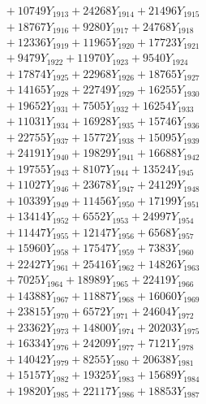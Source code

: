 \documentclass[a4paper,10pt]{article}
\begin{document}
{\begin{align}
&\;  + 10749 Y_{1913} + 24268 Y_{1914} + 21496 Y_{1915} \\[0.3ex]
&\;  + 18767 Y_{1916} + 9280 Y_{1917} + 24768 Y_{1918} \\[0.5ex]\allowbreak
&\;  + 12336 Y_{1919} + 11965 Y_{1920} + 17723 Y_{1921} \\[0.3ex]
&\;  + 9479 Y_{1922} + 11970 Y_{1923} + 9540 Y_{1924} \\[0.3ex]
&\;  + 17874 Y_{1925} + 22968 Y_{1926} + 18765 Y_{1927} \\[0.3ex]
&\;  + 14165 Y_{1928} + 22749 Y_{1929} + 16255 Y_{1930} \\[0.3ex]
&\;  + 19652 Y_{1931} + 7505 Y_{1932} + 16254 Y_{1933} \\[0.3ex]
&\;  + 11031 Y_{1934} + 16928 Y_{1935} + 15746 Y_{1936} \\[0.3ex]
&\;  + 22755 Y_{1937} + 15772 Y_{1938} + 15095 Y_{1939} \\[0.3ex]
&\;  + 24191 Y_{1940} + 19829 Y_{1941} + 16688 Y_{1942} \\[0.3ex]
&\;  + 19755 Y_{1943} + 8107 Y_{1944} + 13524 Y_{1945} \\[0.3ex]
&\;  + 11027 Y_{1946} + 23678 Y_{1947} + 24129 Y_{1948} \\[0.5ex]\allowbreak
&\;  + 10339 Y_{1949} + 11456 Y_{1950} + 17199 Y_{1951} \\[0.3ex]
&\;  + 13414 Y_{1952} + 6552 Y_{1953} + 24997 Y_{1954} \\[0.3ex]
&\;  + 11447 Y_{1955} + 12147 Y_{1956} + 6568 Y_{1957} \\[0.3ex]
&\;  + 15960 Y_{1958} + 17547 Y_{1959} + 7383 Y_{1960} \\[0.3ex]
&\;  + 22427 Y_{1961} + 25416 Y_{1962} + 14826 Y_{1963} \\[0.3ex]
&\;  + 7025 Y_{1964} + 18989 Y_{1965} + 22419 Y_{1966} \\[0.3ex]
&\;  + 14388 Y_{1967} + 11887 Y_{1968} + 16060 Y_{1969} \\[0.3ex]
&\;  + 23815 Y_{1970} + 6572 Y_{1971} + 24604 Y_{1972} \\[0.3ex]
&\;  + 23362 Y_{1973} + 14800 Y_{1974} + 20203 Y_{1975} \\[0.3ex]
&\;  + 16334 Y_{1976} + 24209 Y_{1977} + 7121 Y_{1978} \\[0.5ex]\allowbreak
&\;  + 14042 Y_{1979} + 8255 Y_{1980} + 20638 Y_{1981} \\[0.3ex]
&\;  + 15157 Y_{1982} + 19325 Y_{1983} + 15689 Y_{1984} \\[0.3ex]
&\;  + 19820 Y_{1985} + 22117 Y_{1986} + 18853 Y_{1987} \\[0.3ex]

\end{align}}
\end{document}
